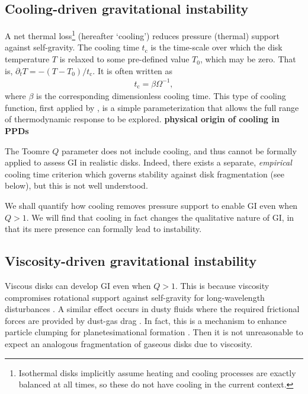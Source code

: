 \documentclass[iop, numberedappendix]{emulateapj}
\newcommand{\p}{\partial}
\newcommand{\tcool}{t_\mathrm{c}}
\begin{document}


\subsection{Cooling-driven gravitational instability}
A net thermal loss\footnote{Isothermal disks implicitly assume 
  heating and cooling processes are exactly balanced at all
  times, so these do not have cooling in the current context.} (hereafter `cooling')
reduces pressure (thermal) support against self-gravity. The cooling time 
$\tcool$ is the time-scale over which the disk temperature $T$ is relaxed
to some pre-defined value $T_0$, which may be zero. That is, $\p_t T =
-(T-T_0)/\tcool$. It is often written as 
\begin{align} 
  \tcool = \beta \Omega^{-1},
\end{align}
where $\beta$ is the corresponding dimensionless cooling time. This
type of cooling function, first applied by \cite{gammie01}, is a
simple parameterization that allows the full range of thermodynamic
response to be explored. 
{\bf physical origin of cooling in PPDs}

The Toomre $Q$ parameter does not include cooling, and thus cannot be
formally applied to assess GI in realistic disks. Indeed, there exists
a separate, \emph{empirical} cooling time criterion which governs
stability against disk fragmentation (see below), but this is not well
understood.     

We shall quantify how cooling removes pressure
support to enable GI even when $Q>1$. 
We will find that cooling in fact changes the 
qualitative nature of GI, in that its mere presence can
formally lead to instability.  

\subsection{Viscosity-driven gravitational instability}
Viscous disks can develop GI even when $Q>1$. This is because
viscosity compromises rotational support against self-gravity for
long-wavelength disturbances
\citep{lynden-bell74,willerding92,gammie96}. A similar effect  
occurs in dusty fluids where the required frictional forces are 
provided by dust-gas drag \citep{ward00, takahashi14}. In fact, this
is a mechanism to enhance particle clumping for planetesimational formation 
\citep{youdin11}. Then it is not unreasonable to expect an analogous
fragmentation of gaseous disks due to viscosity.   
\end{document}

